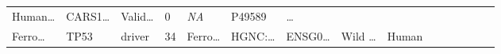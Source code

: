\documentclass[
]{article}
\begin{document}
\begin{longtable}[]{@{}lllllllllllllll@{}}
\begin{minipage}[t]{0.05\columnwidth}
Human\ldots{}\strut
\end{minipage} & \begin{minipage}[t]{0.05\columnwidth}\raggedright
CARS1\ldots{}\strut
\end{minipage} & \begin{minipage}[t]{0.05\columnwidth}\raggedright
Valid\ldots{}\strut
\end{minipage} & \begin{minipage}[t]{0.05\columnwidth}\raggedright
0\strut
\end{minipage} & \begin{minipage}[t]{0.05\columnwidth}\raggedright
\emph{NA}\strut
\end{minipage} & \begin{minipage}[t]{0.05\columnwidth}\raggedright
P49589\strut
\end{minipage} & \begin{minipage}[t]{0.02\columnwidth}\raggedright
\ldots{}\strut
\end{minipage}\tabularnewline
\begin{minipage}[t]{0.05\columnwidth}\raggedright
Ferro\ldots{}\strut
\end{minipage} & \begin{minipage}[t]{0.05\columnwidth}\raggedright
TP53\strut
\end{minipage} & \begin{minipage}[t]{0.04\columnwidth}\raggedright
driver\strut
\end{minipage} & \begin{minipage}[t]{0.02\columnwidth}\raggedright
34\strut
\end{minipage} & \begin{minipage}[t]{0.05\columnwidth}\raggedright
Ferro\ldots{}\strut
\end{minipage} & \begin{minipage}[t]{0.05\columnwidth}\raggedright
HGNC:\ldots{}\strut
\end{minipage} & \begin{minipage}[t]{0.05\columnwidth}\raggedright
ENSG0\ldots{}\strut
\end{minipage} & \begin{minipage}[t]{0.05\columnwidth}\raggedright
Wild \ldots{}\strut
\end{minipage} & \begin{minipage}[t]{0.05\columnwidth}\raggedright
Human\strut
\end{minipage} & \begin{minipage}[t]{0.05\columnwidth}\raggedright

\end{minipage}
\end{longtable}
\end{document}
